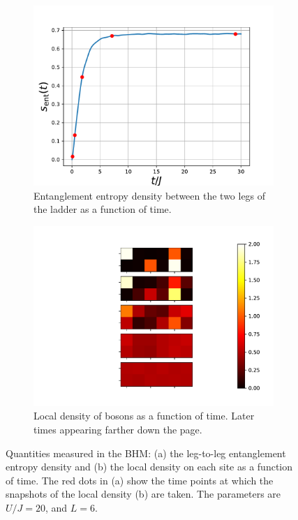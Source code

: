 \documentclass{SciPost}
\newcommand\0{\scalebox{-1}[1]{0}}
\begin{document}
\begin{figure}[t!]
	\centering
	\begin{subfigure}[b]{0.496\textwidth}
		\includegraphics[width=\textwidth]{boson_entropy.pdf}
		\caption{Entanglement entropy density between the two legs of the ladder as a function of time.}
	\end{subfigure}
	\begin{subfigure}[b]{0.496\textwidth}
		\includegraphics[width=\textwidth]{boson_density.pdf}
		\caption{Local density of bosons as a function of time. Later times appearing farther down the page.}
	\end{subfigure}
	\caption{\label{fig:BHM} Quantities measured in the BHM: (a) the leg-to-leg entanglement entropy density and (b) the local density on each site as a function of time. The red dots in (a) show the time points at which the snapshots of the local density (b) are taken. The parameters are $U/J=20$, and $L=6$.}
\end{figure}
\end{document}

